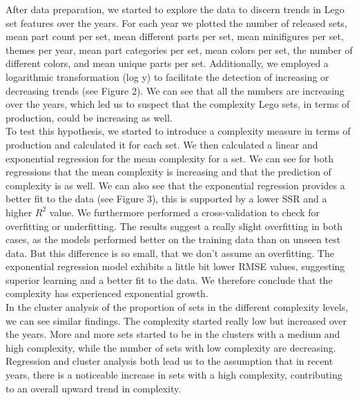 \documentclass{article}
\theoremstyle{plain}
\theoremstyle{definition}
\theoremstyle{remark}
\begin{document}
After data preparation, we started to explore the data to discern trends in Lego set features over the years. For each year we plotted the number of released sets, mean part count per set, mean different parts per set, mean minifigures per set, themes per year, mean part categories per set, mean colors per set, the number of different colors, and mean unique parts per set. Additionally, we employed a logarithmic transformation (log y) to facilitate the detection of increasing or decreasing trends (see Figure 2). We can see that all the numbers are increasing over the years, which led us to suspect that the complexity Lego sets, in terms of production, could be increasing as well. \\
To test this hypothesis, we started to introduce a complexity measure in terms of production and calculated it for each set. We then calculated a linear and exponential regression for the mean complexity for a set. We can see for both regressions that the mean complexity is increasing and that the prediction of complexity is as well. We can also see that the exponential regression provides a better fit to the data (see Figure 3), this is supported by a lower SSR and a higher $R^2$ value. We furthermore performed a cross-validation to check for overfitting or underfitting. The results suggest a really slight overfitting in both cases, as the models performed better on the training data than on unseen test data. But this difference is so small, that we don't assume an overfitting. The exponential regression model exhibits a little bit lower RMSE values, suggesting superior learning and a better fit to the data. We therefore conclude that the complexity has experienced exponential growth. \\
In the cluster analysis of the proportion of sets in the different complexity levels, we can see similar findings. The complexity started really low but increased over the years. More and more sets started to be in the clusters with a medium and high complexity, while the number of sets with low complexity are decreasing. 
Regression and cluster analysis both lead us to the assumption that in recent years, there is a noticeable increase in sets with a high complexity, contributing to an overall upward trend in complexity.\\
\end{document}
